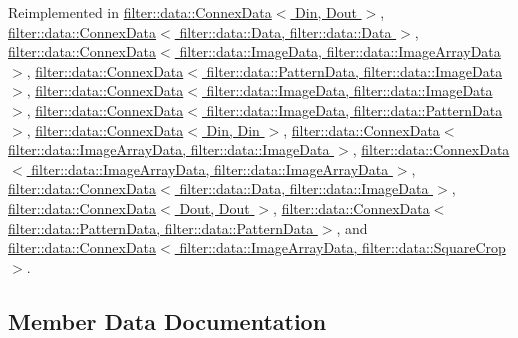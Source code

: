 Reimplemented in \hyperlink{classfilter_1_1data_1_1_connex_data_a4a4ad046f5772283f520189e62327376}{filter\+::data\+::\+Connex\+Data$<$ Din, Dout $>$}, \hyperlink{classfilter_1_1data_1_1_connex_data_a4a4ad046f5772283f520189e62327376}{filter\+::data\+::\+Connex\+Data$<$ filter\+::data\+::\+Data, filter\+::data\+::\+Data $>$}, \hyperlink{classfilter_1_1data_1_1_connex_data_a4a4ad046f5772283f520189e62327376}{filter\+::data\+::\+Connex\+Data$<$ filter\+::data\+::\+Image\+Data, filter\+::data\+::\+Image\+Array\+Data $>$}, \hyperlink{classfilter_1_1data_1_1_connex_data_a4a4ad046f5772283f520189e62327376}{filter\+::data\+::\+Connex\+Data$<$ filter\+::data\+::\+Pattern\+Data, filter\+::data\+::\+Image\+Data $>$}, \hyperlink{classfilter_1_1data_1_1_connex_data_a4a4ad046f5772283f520189e62327376}{filter\+::data\+::\+Connex\+Data$<$ filter\+::data\+::\+Image\+Data, filter\+::data\+::\+Image\+Data $>$}, \hyperlink{classfilter_1_1data_1_1_connex_data_a4a4ad046f5772283f520189e62327376}{filter\+::data\+::\+Connex\+Data$<$ filter\+::data\+::\+Image\+Data, filter\+::data\+::\+Pattern\+Data $>$}, \hyperlink{classfilter_1_1data_1_1_connex_data_a4a4ad046f5772283f520189e62327376}{filter\+::data\+::\+Connex\+Data$<$ Din, Din $>$}, \hyperlink{classfilter_1_1data_1_1_connex_data_a4a4ad046f5772283f520189e62327376}{filter\+::data\+::\+Connex\+Data$<$ filter\+::data\+::\+Image\+Array\+Data, filter\+::data\+::\+Image\+Data $>$}, \hyperlink{classfilter_1_1data_1_1_connex_data_a4a4ad046f5772283f520189e62327376}{filter\+::data\+::\+Connex\+Data$<$ filter\+::data\+::\+Image\+Array\+Data, filter\+::data\+::\+Image\+Array\+Data $>$}, \hyperlink{classfilter_1_1data_1_1_connex_data_a4a4ad046f5772283f520189e62327376}{filter\+::data\+::\+Connex\+Data$<$ filter\+::data\+::\+Data, filter\+::data\+::\+Image\+Data $>$}, \hyperlink{classfilter_1_1data_1_1_connex_data_a4a4ad046f5772283f520189e62327376}{filter\+::data\+::\+Connex\+Data$<$ Dout, Dout $>$}, \hyperlink{classfilter_1_1data_1_1_connex_data_a4a4ad046f5772283f520189e62327376}{filter\+::data\+::\+Connex\+Data$<$ filter\+::data\+::\+Pattern\+Data, filter\+::data\+::\+Pattern\+Data $>$}, and \hyperlink{classfilter_1_1data_1_1_connex_data_a4a4ad046f5772283f520189e62327376}{filter\+::data\+::\+Connex\+Data$<$ filter\+::data\+::\+Image\+Array\+Data, filter\+::data\+::\+Square\+Crop $>$}.



\subsection{Member Data Documentation}
\mbox{\label{classfilter_1_1data_1_1_connex_data_base_a965cbb08a6b61114aa3a66f3254b4f43}} 
